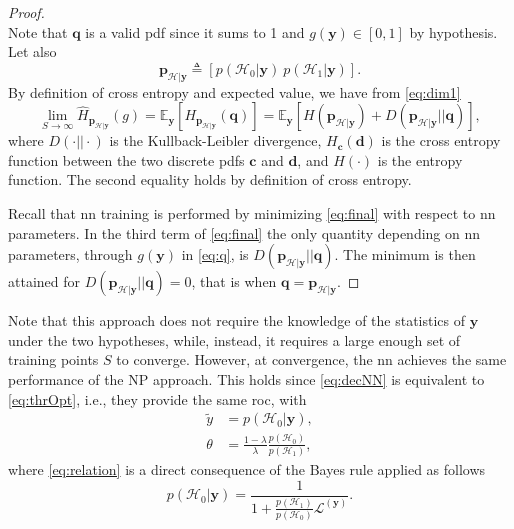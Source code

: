 \documentclass[conference,draftcls,onecolumn]{IEEEtran}
\newcommand{\cross}[2]{H_{#1}(#2)}
\newcommand{\hatcross}[2]{\hat{H}_{#1}(#2)}
\newcommand{\gy}{g(\bm y)}
\newcommand{\E}[2]{\mathbb{E}_{#1}\left[#2\right]}
\begin{document}
\begin{proof}
\begin{subequations}
\end{subequations}
Note that $\bm q$ is a valid \ac{pdf} since it sums to 1 and $\gy \in [0,1]$ by hypothesis. Let also 
\begin{equation}
	\bm p_{\mathcal{H}|\bm y} \triangleq [p(\mathcal{H}_0|\bm y)\ p(\mathcal{H}_1|\bm y)].	
\end{equation}
By definition of cross entropy and expected value, we have from \eqref{eq:dim1}
\begin{equation}
\label{eq:final}
	\lim_{S \to \infty}	\hatcross{\bm p_{\mathcal{H}|\bm y}}{g} =	\E{\bm y}{ \cross{\bm p_{\mathcal{H}|\bm y}}{\bm q}} = 
		\E{\bm y}{H (\bm p_{\mathcal{H}|\bm y}) + D(\bm p_{\mathcal{H}|\bm y}||\bm q)},
\end{equation}
where $D(\cdot||\cdot)$ is the Kullback-Leibler divergence, $H_{\bm c}(\bm d)$ is the cross entropy function between the two discrete \acp{pdf} $\bm c$ and $\bm d$, and $H(\cdot)$ is the entropy function. The second equality holds by definition of cross entropy.

Recall that \ac{nn} training is performed by minimizing \eqref{eq:final} with respect to \ac{nn} parameters. In the third term of \eqref{eq:final} the only quantity depending on \ac{nn} parameters, through $\gy$ in \eqref{eq:q}, is $D(\bm p_{\mathcal{H}|\bm y}||\bm q)$. The minimum is then attained for $D(\bm p_{\mathcal{H}|\bm y}||\bm q)=0$, that is when $\bm q = \bm p_{\mathcal{H}|\bm y}$.
\end{proof}

Note that this approach does not require the knowledge of the statistics of $\bm{y}$ under the two hypotheses, while, instead, it requires a large enough set of training points $S$ to converge.
However, at convergence, the \ac{nn} achieves the same performance of the NP approach. This holds since \eqref{eq:decNN} is equivalent to \eqref{eq:thrOpt}, i.e., they provide the same \ac{roc}, with
\begin{align}
	\tilde{y} &= p(\mathcal{H}_0|\bm y), \\
	\label{eq:relation}
	\theta &= \frac{1-\lambda}{\lambda} \frac{p(\mathcal{H}_0)}{p(\mathcal{H}_1)},	
\end{align}  
where \eqref{eq:relation} is a direct consequence of the Bayes rule applied as follows 
\begin{equation}
	p(\mathcal{H}_0| \bm y) = \frac{1}{1+  \frac{p(\mathcal{H}_1)}{p(\mathcal{H}_0)} \mathcal{L}^{(\bm y)}}.	
\end{equation}
\end{document}
